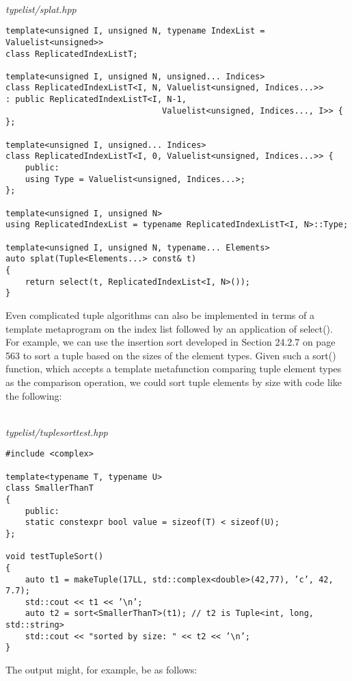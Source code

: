 \hspace*{\fill} \\ %
\noindent
\textit{typelist/splat.hpp}
\begin{lstlisting}[style=styleCXX]
template<unsigned I, unsigned N, typename IndexList = Valuelist<unsigned>>
class ReplicatedIndexListT;

template<unsigned I, unsigned N, unsigned... Indices>
class ReplicatedIndexListT<I, N, Valuelist<unsigned, Indices...>>
: public ReplicatedIndexListT<I, N-1,
								Valuelist<unsigned, Indices..., I>> {
};

template<unsigned I, unsigned... Indices>
class ReplicatedIndexListT<I, 0, Valuelist<unsigned, Indices...>> {
	public:
	using Type = Valuelist<unsigned, Indices...>;
};

template<unsigned I, unsigned N>
using ReplicatedIndexList = typename ReplicatedIndexListT<I, N>::Type;

template<unsigned I, unsigned N, typename... Elements>
auto splat(Tuple<Elements...> const& t)
{
	return select(t, ReplicatedIndexList<I, N>());
}
\end{lstlisting}

Even complicated tuple algorithms can also be implemented in terms of a template metaprogram on the index list followed by an application of select(). For example, we can use the insertion sort developed in Section 24.2.7 on page 563 to sort a tuple based on the sizes of the element types. Given such a sort() function, which accepts a template metafunction comparing tuple element types as the comparison operation, we could sort tuple elements by size with code like the following:

\hspace*{\fill} \\ %
\noindent
\textit{typelist/tuplesorttest.hpp}
\begin{lstlisting}[style=styleCXX]
#include <complex>

template<typename T, typename U>
class SmallerThanT
{
	public:
	static constexpr bool value = sizeof(T) < sizeof(U);
};

void testTupleSort()
{
	auto t1 = makeTuple(17LL, std::complex<double>(42,77), ’c’, 42, 7.7);
	std::cout << t1 << ’\n’;
	auto t2 = sort<SmallerThanT>(t1); // t2 is Tuple<int, long, std::string>
	std::cout << "sorted by size: " << t2 << ’\n’;
}
\end{lstlisting}

The output might, for example, be as follows:

